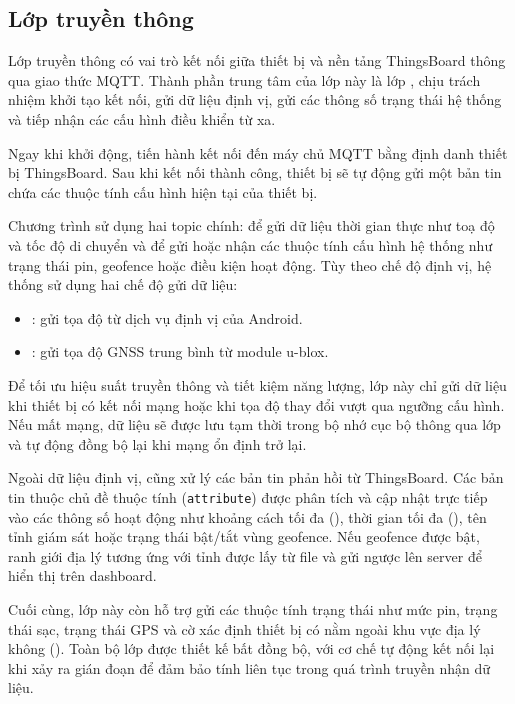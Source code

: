 \documentclass[../DoAn.tex]{subfiles}
\begin{document}
\subsection{Lớp truyền thông}
\label{subsection:4.2.4}
Lớp truyền thông có vai trò kết nối giữa thiết bị và nền tảng ThingsBoard thông qua giao thức MQTT. Thành phần trung tâm của lớp này là lớp , chịu trách nhiệm khởi tạo kết nối, gửi dữ liệu định vị, gửi các thông số trạng thái hệ thống và tiếp nhận các cấu hình điều khiển từ xa. 

Ngay khi khởi động,  tiến hành kết nối đến máy chủ MQTT bằng định danh thiết bị ThingsBoard. Sau khi kết nối thành công, thiết bị sẽ tự động gửi một bản tin  chứa các thuộc tính cấu hình hiện tại của thiết bị.

Chương trình sử dụng hai topic chính:  để gửi dữ liệu thời gian thực như toạ độ và tốc độ di chuyển và  để gửi hoặc nhận các thuộc tính cấu hình hệ thống như trạng thái pin, geofence hoặc điều kiện hoạt động. Tùy theo chế độ định vị, hệ thống sử dụng hai chế độ gửi dữ liệu:
\begin{itemize}
    \item {}: gửi tọa độ từ dịch vụ định vị của Android.
    \item {}: gửi tọa độ GNSS trung bình từ module u-blox.
\end{itemize}

Để tối ưu hiệu suất truyền thông và tiết kiệm năng lượng, lớp này chỉ gửi dữ liệu khi thiết bị có kết nối mạng hoặc khi tọa độ thay đổi vượt qua ngưỡng cấu hình. Nếu mất mạng, dữ liệu sẽ được lưu tạm thời trong bộ nhớ cục bộ thông qua lớp  và tự động đồng bộ lại khi mạng ổn định trở lại.

Ngoài dữ liệu định vị,  cũng xử lý các bản tin phản hồi từ ThingsBoard. Các bản tin thuộc chủ đề thuộc tính (\texttt{attribute}) được phân tích và cập nhật trực tiếp vào các thông số hoạt động như khoảng cách tối đa (), thời gian tối đa (), tên tỉnh giám sát hoặc trạng thái bật/tắt vùng geofence. Nếu geofence được bật, ranh giới địa lý tương ứng với tỉnh được lấy từ file  và gửi ngược lên server để hiển thị trên dashboard.

Cuối cùng, lớp này còn hỗ trợ gửi các thuộc tính trạng thái như mức pin, trạng thái sạc, trạng thái GPS và cờ xác định thiết bị có nằm ngoài khu vực địa lý không (). Toàn bộ lớp được thiết kế bất đồng bộ, với cơ chế tự động kết nối lại khi xảy ra gián đoạn để đảm bảo tính liên tục trong quá trình truyền nhận dữ liệu.
\end{document}
